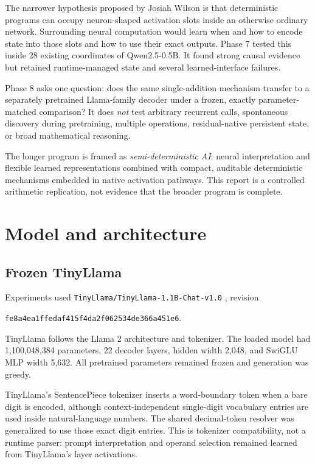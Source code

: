 \documentclass[11pt]{article}
\newcommand{\code}[1]{\texttt{#1}}
\begin{document}
The narrower hypothesis proposed by Josiah Wilson is that deterministic
programs can occupy neuron-shaped activation slots inside an otherwise ordinary
network. Surrounding neural computation would learn when and how to encode
state into those slots and how to use their exact outputs. Phase 7 tested this
inside 28 existing coordinates of Qwen2.5-0.5B. It found strong causal evidence
but retained runtime-managed state and several learned-interface failures.

Phase 8 asks one question: does the same single-addition mechanism transfer to
a separately pretrained Llama-family decoder under a frozen, exactly
parameter-matched comparison? It does \emph{not} test arbitrary recurrent
calls, spontaneous discovery during pretraining, multiple operations,
residual-native persistent state, or broad mathematical reasoning.

The longer program is framed as \emph{semi-deterministic AI}: neural
interpretation and flexible learned representations combined with compact,
auditable deterministic mechanisms embedded in native activation pathways.
This report is a controlled arithmetic replication, not evidence that the
broader program is complete.

\section{Model and architecture}

\subsection{Frozen TinyLlama}

Experiments used
\code{TinyLlama/TinyLlama-1.1B-Chat-v1.0} \cite{tinyllama2024}, revision
\begin{sloppypar}
\code{fe8a4ea1ffedaf415f4da2f062534de366a451e6}.
\end{sloppypar}
TinyLlama follows the Llama 2 architecture and tokenizer. The loaded model had
1,100,048,384 parameters, 22 decoder layers, hidden width 2,048, and SwiGLU MLP
width 5,632. All pretrained parameters remained frozen and generation was
greedy.

TinyLlama's SentencePiece tokenizer inserts a word-boundary token when a bare
digit is encoded, although context-independent single-digit vocabulary entries
are used inside natural-language numbers. The shared decimal-token resolver was
generalized to use those exact digit entries. This is tokenizer compatibility,
not a runtime parser: prompt interpretation and operand selection remained
learned from TinyLlama's layer activations.
\end{document}

